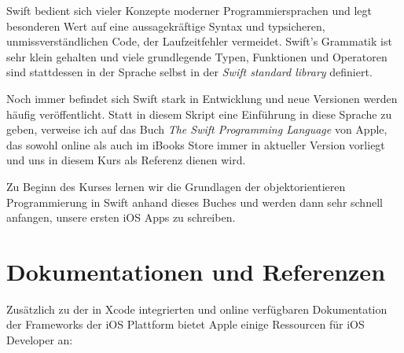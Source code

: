 \documentclass[parskip=half, final]{scrreprt}
\begin{document}
Swift bedient sich vieler Konzepte moderner Programmiersprachen und legt besonderen Wert auf eine aussagekräftige Syntax und typsicheren, unmissverständlichen Code, der Laufzeitfehler vermeidet. Swift's Grammatik ist sehr klein gehalten und viele grundlegende Typen, Funktionen und Operatoren sind stattdessen in der Sprache selbst in der \emph{Swift standard library} definiert.

Noch immer befindet sich Swift stark in Entwicklung und neue Versionen werden häufig veröffentlicht. Statt in diesem Skript eine Einführung in diese Sprache zu geben, verweise ich auf das Buch \emph{The Swift Programming Language} von Apple, das sowohl online  als auch im iBooks Store  immer in aktueller Version vorliegt und uns in diesem Kurs als Referenz dienen wird.

Zu Beginn des Kurses lernen wir die Grundlagen der objektorientieren Programmierung in Swift anhand dieses Buches und werden dann sehr schnell anfangen, unsere ersten iOS Apps zu schreiben.


\section{Dokumentationen und Referenzen}\label{sec:docs}

Zusätzlich zu der in Xcode integrierten  und online verfügbaren Dokumentation der Frameworks der iOS Plattform bietet Apple einige Ressourcen für iOS Developer an:
\end{document}
